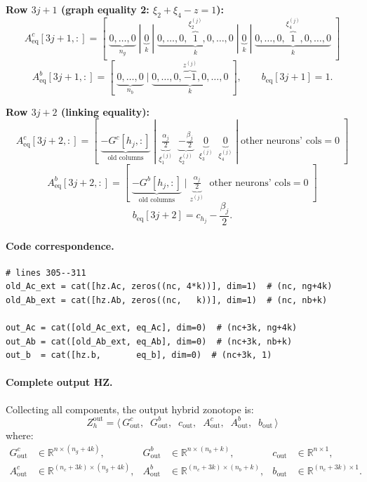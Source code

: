 \documentclass{article}
\begin{document}
\medskip
\noindent\textbf{Row $3j{+}1$ (graph equality 2: $\xi_2 + \xi_4 - z = 1$):}
\[
A^c_{\mathrm{eq}}[3j{+}1, :] = [\;\underbrace{0, \ldots, 0}_{n_g} \;|\; \underbrace{0}_{k} \;|\; \underbrace{0, \ldots, 0, \overbrace{1}^{\xi_2^{(j)}}, 0, \ldots, 0}_{k} \;|\; \underbrace{0}_{k} \;|\; \underbrace{0, \ldots, 0, \overbrace{1}^{\xi_4^{(j)}}, 0, \ldots, 0}_{k}\;]
\]
\[
A^b_{\mathrm{eq}}[3j{+}1, :] = [\;\underbrace{0, \ldots, 0}_{n_b} \;|\; \underbrace{0, \ldots, 0, \overbrace{-1}^{z^{(j)}}, 0, \ldots, 0}_{k}\;], \qquad
b_{\mathrm{eq}}[3j{+}1] = 1.
\]

\medskip
\noindent\textbf{Row $3j{+}2$ (linking equality):}
\[
A^c_{\mathrm{eq}}[3j{+}2, :] = [\;\underbrace{-G^c[h_j, :]}_{\text{old columns}} \;|\; \underbrace{\tfrac{\alpha_j}{2}}_{\xi_1^{(j)}} \;\; \underbrace{-\tfrac{\beta_j}{2}}_{\xi_2^{(j)}} \;\; \underbrace{0}_{\xi_3^{(j)}} \;\; \underbrace{0}_{\xi_4^{(j)}} \;|\; \text{other neurons' cols} = 0\;]
\]
\[
A^b_{\mathrm{eq}}[3j{+}2, :] = [\;\underbrace{-G^b[h_j, :]}_{\text{old columns}} \;|\; \underbrace{\tfrac{\alpha_j}{2}}_{z^{(j)}} \;\; \text{other neurons' cols} = 0\;]
\]
\[
b_{\mathrm{eq}}[3j{+}2] = c_{h_j} - \frac{\beta_j}{2}.
\]

\paragraph{Code correspondence.}
\begin{verbatim}
# lines 305--311
old_Ac_ext = cat([hz.Ac, zeros((nc, 4*k))], dim=1)  # (nc, ng+4k)
old_Ab_ext = cat([hz.Ab, zeros((nc,   k))], dim=1)  # (nc, nb+k)

out_Ac = cat([old_Ac_ext, eq_Ac], dim=0)  # (nc+3k, ng+4k)
out_Ab = cat([old_Ab_ext, eq_Ab], dim=0)  # (nc+3k, nb+k)
out_b  = cat([hz.b,       eq_b], dim=0)  # (nc+3k, 1)
\end{verbatim}

\paragraph{Complete output HZ.}

Collecting all components, the output hybrid zonotope is:
\begin{equation}
\label{eq:case3_output_hz}
Z_h^{\mathrm{out}} = \langle\, G^c_{\mathrm{out}},\;\; G^b_{\mathrm{out}},\;\; c_{\mathrm{out}},\;\; A^c_{\mathrm{out}},\;\; A^b_{\mathrm{out}},\;\; b_{\mathrm{out}} \,\rangle
\end{equation}
where:
\begin{align}
G^c_{\mathrm{out}} &\in \mathbb{R}^{n \times (n_g + 4k)}, &
G^b_{\mathrm{out}} &\in \mathbb{R}^{n \times (n_b + k)}, &
c_{\mathrm{out}} &\in \mathbb{R}^{n \times 1}, \\
A^c_{\mathrm{out}} &\in \mathbb{R}^{(n_c + 3k) \times (n_g + 4k)}, &
A^b_{\mathrm{out}} &\in \mathbb{R}^{(n_c + 3k) \times (n_b + k)}, &
b_{\mathrm{out}} &\in \mathbb{R}^{(n_c + 3k) \times 1}.
\end{align}
\end{document}
